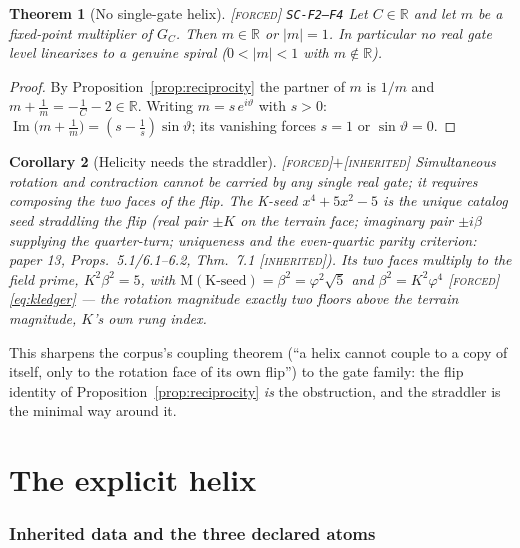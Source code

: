 \documentclass[11pt]{article}
\newcommand{\tagF}{\textcolor{cF}{\textsc{[forced]}}}
\newcommand{\tagI}{\textcolor{cI}{\textsc{[inherited]}}}
\newcommand{\hx}[1]{\textcolor{cC}{\footnotesize\texttt{#1}}}
\newcommand{\R}{\mathbb{R}}
\newcommand{\gp}{\varphi}
\newcommand{\M}{\mathrm{M}}
\theoremstyle{plain}
\newtheorem{theorem}{Theorem}[section]
\newtheorem{corollary}[theorem]{Corollary}
\theoremstyle{definition}
\theoremstyle{remark}
\begin{document}
\begin{theorem}[No single-gate helix]\label{thm:obstruction}\tagF{} \hx{SC-F2--F4}
Let $C\in\R$ and let $m$ be a fixed-point multiplier of $G_C$. Then $m\in\R$ or
$|m|=1$. In particular no real gate level linearizes to a genuine spiral
($0<|m|<1$ with $m\notin\R$).
\end{theorem}

\begin{proof}
By Proposition~\ref{prop:reciprocity} the partner of $m$ is $1/m$ and
$m+\tfrac1m=-\tfrac1C-2\in\R$. Writing $m=s\,e^{i\vartheta}$ with $s>0$:
$\operatorname{Im}\bigl(m+\tfrac1m\bigr)=(s-\tfrac1s)\sin\vartheta$; its vanishing
forces $s=1$ or $\sin\vartheta=0$.
\end{proof}

\begin{corollary}[Helicity needs the straddler]\label{cor:straddler}\tagF{}$+$\tagI{}
Simultaneous rotation and contraction cannot be carried by any single real gate; it
requires composing the two faces of the flip. The K-seed $x^4+5x^2-5$ is the unique
catalog seed straddling the flip (real pair $\pm K$ on the terrain face; imaginary
pair $\pm i\beta$ supplying the quarter-turn; uniqueness and the even-quartic parity
criterion: paper 13, Props.\ 5.1/6.1--6.2, Thm.\ 7.1 \tagI{}). Its two faces multiply
to the field prime, $K^2\beta^2=5$, with $\M(\text{K-seed})=\beta^2=\gp^2\sqrt5$ and
$\beta^2=K^2\gp^4$ \tagF{} \eqref{eq:kledger} --- the rotation magnitude exactly two
floors above the terrain magnitude, $K$'s own rung index.
\end{corollary}

This sharpens the corpus's coupling theorem (``a helix cannot couple to a copy of
itself, only to the rotation face of its own flip'') to the gate family: the flip
identity of Proposition~\ref{prop:reciprocity} \emph{is} the obstruction, and the
straddler is the minimal way around it.

\part{The explicit helix}

\section{Inherited data and the three declared atoms}\label{sec:atoms}
\end{document}
